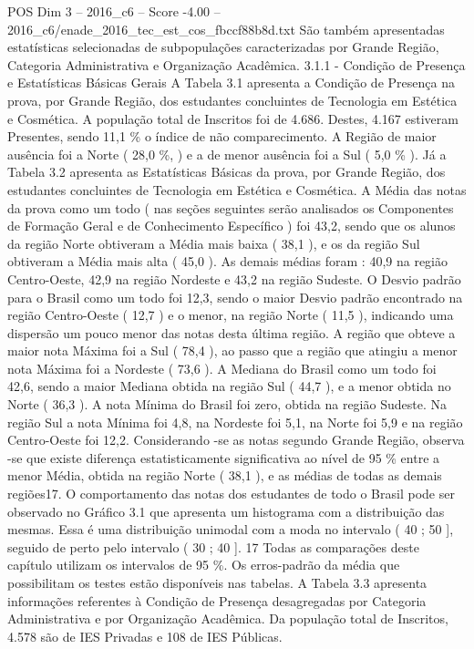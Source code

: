 \begin{textsample}{POS Dim 3 – 2016\_c6 – Score -4.00 – 2016\_c6/enade\_2016\_tec\_est\_cos\_fbccf88b8d.txt}
São também apresentadas estatísticas selecionadas de subpopulações caracterizadas por Grande Região, Categoria Administrativa e Organização Acadêmica. 3.1.1 - Condição de Presença e Estatísticas Básicas Gerais A Tabela 3.1 apresenta a Condição de Presença na prova, por Grande Região, dos estudantes concluintes de Tecnologia em Estética e Cosmética.
A população total de Inscritos foi de 4.686.
Destes, 4.167 estiveram Presentes, sendo 11,1 \% o índice de não comparecimento.
A Região de maior ausência foi a Norte ( 28,0 \%, ) e a de menor ausência foi a Sul ( 5,0 \% ).
Já a Tabela 3.2 apresenta as Estatísticas Básicas da prova, por Grande Região, dos estudantes concluintes de Tecnologia em Estética e Cosmética.
A Média das notas da prova como um todo ( nas seções seguintes serão analisados os Componentes de Formação Geral e de Conhecimento Específico ) foi 43,2, sendo que os alunos da região Norte obtiveram a Média mais baixa ( 38,1 ), e os da região Sul obtiveram a Média mais alta ( 45,0 ).
As demais médias foram : 40,9 na região Centro-Oeste, 42,9 na região Nordeste e 43,2 na região Sudeste.
O Desvio padrão para o Brasil como um todo foi 12,3, sendo o maior Desvio padrão encontrado na região Centro-Oeste ( 12,7 ) e o menor, na região Norte ( 11,5 ), indicando uma dispersão um pouco menor das notas desta última região.
A região que obteve a maior nota Máxima foi a Sul ( 78,4 ), ao passo que a região que atingiu a menor nota Máxima foi a Nordeste ( 73,6 ).
A Mediana do Brasil como um todo foi 42,6, sendo a maior Mediana obtida na região Sul ( 44,7 ), e a menor obtida no Norte ( 36,3 ).
A nota Mínima do Brasil foi zero, obtida na região Sudeste.
Na região Sul a nota Mínima foi 4,8, na Nordeste foi 5,1, na Norte foi 5,9 e na região Centro-Oeste foi 12,2.
Considerando -se as notas segundo Grande Região, observa -se que existe diferença estatisticamente significativa ao nível de 95 \% entre a menor Média, obtida na região Norte ( 38,1 ), e as médias de todas as demais regiões17.
O comportamento das notas dos estudantes de todo o Brasil pode ser observado no Gráfico 3.1 que apresenta um histograma com a distribuição das mesmas.
Essa é uma distribuição unimodal com a moda no intervalo ( 40 ; 50 ], seguido de perto pelo intervalo ( 30 ; 40 ]. 17 Todas as comparações deste capítulo utilizam os intervalos de 95 \%.
Os erros-padrão da média que possibilitam os testes estão disponíveis nas tabelas.
A Tabela 3.3 apresenta informações referentes à Condição de Presença desagregadas por Categoria Administrativa e por Organização Acadêmica.
Da população total de Inscritos, 4.578 são de IES Privadas e 108 de IES Públicas.

\end{textsample}
